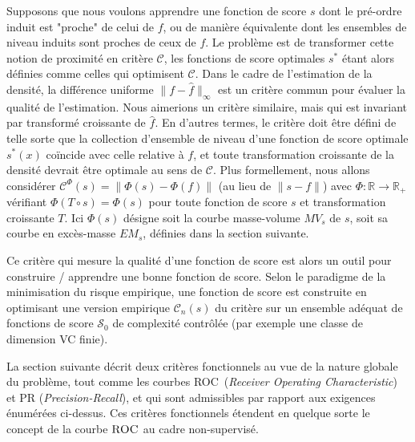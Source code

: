 \documentclass[a4paper, 12pt]{article}
\newcommand{\crit}{\mathcal{C}}
\def\S{\mathcal{S}}
\def\crit{\mathcal{C}}
\def\roc{\textsc{ROC}}
\begin{document}
Supposons que nous voulons apprendre une fonction de score $ s $ dont le pré-ordre induit est "proche" de celui de $f$, ou de manière équivalente dont les ensembles de niveau induits sont proches de ceux de $ f $. Le problème est de transformer cette notion de proximité en critère $ \crit $, les fonctions de score optimales $ s ^ * $ étant alors définies comme celles qui optimisent $ \crit $. Dans le cadre de l'estimation de la densité, la différence uniforme $ \| f - \hat f \|_\infty $ est un critère commun pour évaluer la qualité de l'estimation. Nous aimerions un critère similaire, mais qui est invariant par transformé croissante de $ \hat f $. En d'autres termes, le critère doit être défini de telle sorte que la collection d'ensemble de niveau d'une fonction de score optimale $ s ^ * (x) $ coïncide avec celle relative à $ f $, et toute transformation croissante de la densité devrait être optimale au sens de $ \crit $.
Plus formellement, nous allons considérer $ \crit ^ {\Phi} (s) = \| \Phi(s)  - \Phi (f) \| $ (au lieu de $ \| s - f \| $) 
avec $ \Phi: \mathbb {R} \to \mathbb {R} _ + $ vérifiant $ \Phi (T \circ s) = \Phi (s) $ pour toute fonction de score $ s $ et transformation croissante $ T $. Ici $ \Phi (s) $ désigne soit la courbe masse-volume $ MV_s $ de $ s $, soit sa courbe en excès-masse $ EM_s $, définies dans la section suivante.

Ce critère qui mesure la qualité d'une fonction de score est alors un outil pour construire / apprendre une bonne fonction de score.
Selon le paradigme de la minimisation du risque empirique, une fonction de score est construite en optimisant une version empirique $ \crit_n (s) $ du critère sur un ensemble adéquat de fonctions de score $ \S_0 $ de complexité contrôlée (par exemple une classe de dimension {\sc VC} finie).

La section suivante décrit deux critères fonctionnels au vue de la nature globale du problème, tout comme les courbes \roc~(\emph{Receiver Operating Characteristic}) et PR (\emph {Precision-Recall}), et qui sont admissibles par rapport aux exigences énumérées ci-dessus. Ces critères fonctionnels étendent en quelque sorte le concept de la courbe $ \roc $ au cadre non-supervisé.
\end{document}
